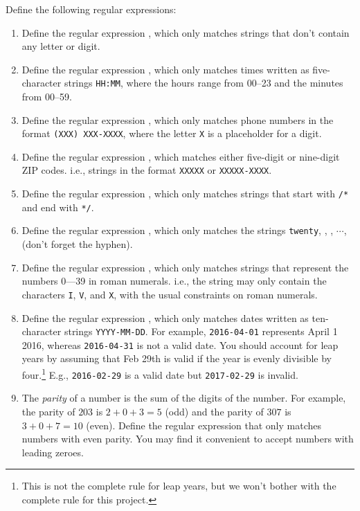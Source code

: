 \documentclass[9pt]{extbook}
\begin{document}
Define the following regular expressions:

\begin{enumerate}

  \item Define the regular expression , which only
   matches strings that don't contain any letter or digit.

  \item Define the regular expression , which only matches
  times written as five-character strings \texttt{HH:MM}, where the hours 
  range from 00--23 and the minutes from 00--59.

  \item Define the regular expression , which only matches 
  phone numbers in the format \texttt{(XXX) XXX-XXXX}, where the letter \texttt{X} is a placeholder for a digit.

  \item Define the regular expression , which matches either 
  five-digit or nine-digit ZIP codes. i.e., strings in the format \texttt{XXXXX} or \texttt{XXXXX-XXXX}.

  \item  Define the regular expression , which only matches
  strings that start with \texttt{/*} and end with \texttt{*/}.

  \item Define the regular expression , which only 
  matches the strings \texttt{twenty}, , 
  , $\cdots$,  (don't forget the hyphen).

  \item Define the regular expression , which only 
  matches strings that represent the numbers 0---39 in roman numerals. i.e., 
  the string may only contain the characters \texttt{I}, \texttt{V}, 
  and \texttt{X}, with the usual constraints on roman numerals.


  \item Define the regular expression , which only matches 
  dates written as ten-character strings \texttt{YYYY-MM-DD}. For example,
   \texttt{2016-04-01} represents April 1 2016, whereas \texttt{2016-04-31} is 
   not a valid date. You should account for leap years by assuming that Feb 29th 
   is valid if the year is evenly divisible by four.\footnote{This is not the 
   complete rule for leap years, but we won't bother with the complete rule
   for this project.}  E.g., \texttt{2016-02-29} is a valid date but 
   \texttt{2017-02-29} is invalid.

  \item The \emph{parity} of a number is the sum of the digits of the number. 
  For example, the parity of $203$ is $2 + 0 + 3 = 5$ (odd) and the parity of 
  $307$ is $3 + 0 + 7 = 10$ (even). Define the regular expression 
   that only matches numbers with even parity. 
  You may find it convenient to accept numbers with leading zeroes.

\end{enumerate}
\end{document}
